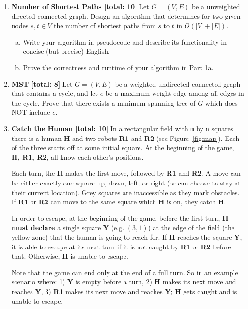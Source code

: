 \documentclass{assignment-263}
\begin{document}
\think

  \begin{enumerate}[1.]

\item \textbf{Number of Shortest Paths [total: 10]}
Let $G = (V ,E)$ be a unweighted directed connected graph. Design an algorithm that determines for two given nodes $s, t \in V$ the number of shortest paths from $s$ to $t$ in $O(|V| + |E|)$. 
\begin{enumerate}[(a)]
\item Write your algorithm in pseudocode and describe its functionality in concise (but precise) English.
\item Prove the correctness and runtime of your algorithm in Part 1a.
\end{enumerate}

\item \textbf{MST [total: 8]} 
Let $G = (V ,E)$ be a weighted undirected connected graph that
contains a cycle, and let $e$ be a maximum-weight edge among all edges in the cycle. Prove that there exists a minimum spanning tree of $G$ which does NOT include $e$.


\item \textbf{Catch the Human [total: 10]}
  In a rectangular field with \texttt{m} by \texttt{n} squares there is a human \textbf{H} and two robots \textbf{R1} and \textbf{R2} (see Figure~\ref{fig:map}). 
  Each of the three starts off at some initial square.
  At the beginning of the game, \textbf{H, R1, R2}, all know each
  other's positions. 

  Each turn, the \textbf{H} makes the first move, followed by \textbf{R1} and \textbf{R2}. 
  A move can be either exactly one square up, down, left, or right (or
  can choose to stay at their current location).
  Grey squares are inaccessible as they mark obstacles.
  If \textbf{R1} or \textbf{R2} can move to the same square which \textbf{H} is on, they catch \textbf{H}.

  In order to escape, at the beginning of the game, before the first
  turn, \textbf{H must declare} a single square \textbf{Y}
  (e.g. $(3,1)$) at the edge of the field (the yellow zone) that the
  human is going to reach for. If \textbf{H} reaches the square
  \textbf{Y}, it is able to escape at its next turn if it is not
  caught by \textbf{R1} or \textbf{R2} before that. Otherwise,
  \textbf{H} is unable to escape.

  Note that the game can end only at the end of a full turn. So in an
  example scenario where: 1) \textbf{Y} is empty before a turn, 2)
  \textbf{H} makes its next move and reaches \textbf{Y}, 3)
  \textbf{R1} makes its next move and reaches \textbf{Y};  \textbf{H}
  gets caught and is unable to escape.
  

\end{enumerate}
\end{document}
